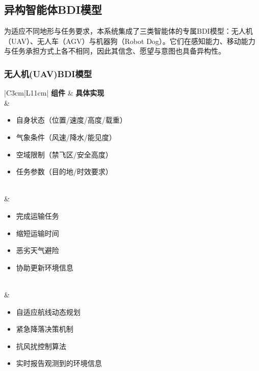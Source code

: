 \documentclass[12pt,a4paper]{article}
\begin{document}
\subsection{异构智能体BDI模型}

为适应不同地形与任务要求，本系统集成了三类智能体的专属BDI模型：无人机（UAV）、无人车（AGV）与机器狗（Robot Dog）。它们在感知能力、移动能力与任务承担方式上各不相同，因此其信念、愿望与意图也具备异构性。

\subsubsection{无人机(UAV)BDI模型}
\begin{table}[h]
	\centering
	\caption{无人机BDI模型}
	\label{tab:uav-bdi}
	\begin{tabular}{|C{3cm}|L{11cm}|}
		\hline
		\textbf{组件} & \textbf{具体实现} \\
		\hline
		 & 
		\begin{minipage}[t]{\linewidth}
			\begin{itemize}[leftmargin=*, nosep, topsep=0pt, itemsep=3pt]
				\item 自身状态（位置/速度/高度/载重）
				\item 气象条件（风速/降水/能见度）
				\item 空域限制（禁飞区/安全高度）
				\item 任务参数（目的地/时效要求）
			\end{itemize}
		\end{minipage} \\
		\hline
		 & 
		\begin{minipage}[t]{\linewidth}
			\begin{itemize}[leftmargin=*, nosep, topsep=0pt, itemsep=3pt]
				\item 完成运输任务
				\item 缩短运输时间
				\item 恶劣天气避险
				\item 协助更新环境信息
			\end{itemize}
		\end{minipage} \\
		\hline
		 & 
		\begin{minipage}[t]{\linewidth}
			\begin{itemize}[leftmargin=*, nosep, topsep=0pt, itemsep=3pt]
				\item 自适应航线动态规划
				\item 紧急降落决策机制
				\item 抗风扰控制算法
				\item 实时报告观测到的环境信息
			\end{itemize}
		\end{minipage} \\
		\hline
	\end{tabular}
\end{table}
\FloatBarrier
\end{document}
